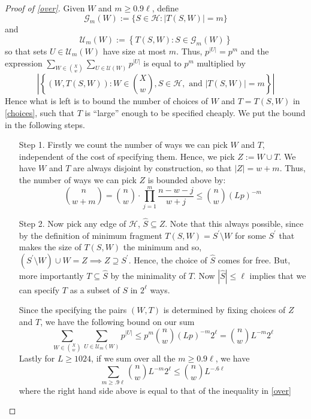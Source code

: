 \documentclass[12pt,oneside,reqno]{amsart}
\theoremstyle{definition}
\numberwithin{equation}{theorem}
\newcommand{\cH}{{\mathcal H}}
\newcommand{\cU}{{\mathcal U}}
\begin{document}
\begin{proof}[Proof of \ref{over}] 
Given $W$ and $m \geq 0.9\ell$, define 
$$
\mathcal{G}_{m}(W):=\{S \in \mathcal{H}: |T(S, W)|=m\}
$$
and 
$$
\mathcal{U}_{m}(W):=\left\{T(S, W): S \in \mathcal{G}_{m}(W)\right\}
$$
so that sets $U \in \cU_m(W)$ have size at most $m$. Thus, $p^{|U|} = p^{m}$ and the expression $\sum_{W \in \binom{X}{w}} \sum_{U \in \mathcal{U}(W)} p^{|U|}$ is equal to $p^{m}$ multiplied by
\begin{equation}\label{choices}
 \left|\left\{(W, T(S, W)): W \in\binom{X}{w}, S \in \mathcal{H}, \text { and } |T(S, W)|=m\right\} \right|
\end{equation}
Hence what is left is to bound the number of choices of $W$ and $T = T(S,W)$ in \ref{choices}, such that $T$ is ``large'' enough to be specified cheaply. We put the bound in the following steps. 
\begin{itemize}
\item[Step 1.] Firstly we count the number of ways we can pick $W$ and $T$, independent of the cost of specifying them. Hence, we pick $Z:=W \cup T$. We have $W$ and $T$ are always disjoint by construction, so that $|Z|=w+m$. Thus, the number of ways we can pick $Z$ is bounded above by: 
$$
\binom{n}{w+m}=\binom{n}{w} \cdot \prod_{j=1}^{m} \frac{n-w-j}{w+j} \leq \binom{n}{w}(L p)^{-m}
$$


\item[Step 2.] Now pick any edge of $\cH$, $\hat{S} \subseteq Z$. Note that this always possible, since by the definition of minimum fragment $T(S,W) = S^{\prime}\setminus W$ for some $S^{\prime}$ that makes the size of $T(S,W)$ the minimum and so, $(S^{\prime} \setminus W) \cup W = Z  \implies  Z \supseteq S^{\prime}$. Hence, the choice of $\hat{S}$ comes for free. But, more importantly $T \subseteq \hat{S}$ by the minimality of $T$. Now $|\hat{S}|\leq \ell$ implies that we can specify $T$ as a subset of $S$ in $2^{\ell}$ ways. 

Since the specifying the pairs $(W,T)$ is determined by fixing choices of $Z$ and $T$, we have the following bound on our sum
\[
\sum_{W \in\binom{X}{w}} \sum_{U \in \mathcal{U}_{m}(W)} p^{|U|} \leq p^{m}\binom{n}{w}(L p)^{-m} 2^{\ell}=\binom{n}{w} L^{-m} 2^{\ell}
\]
Lastly for $L\geq1024$, if we sum over all the $m\geq 0.9 \ell$, we have 
\begin{equation}
\sum_{m \geq .9 \ell}\binom{n}{w} L^{-m} 2^{\ell} \leq\binom{n}{w} L^{-.6 \ell}
\end{equation}
where the right hand side above is equal to that of the inequality in \ref{over}
\end{itemize}
\end{proof}
\end{document}
